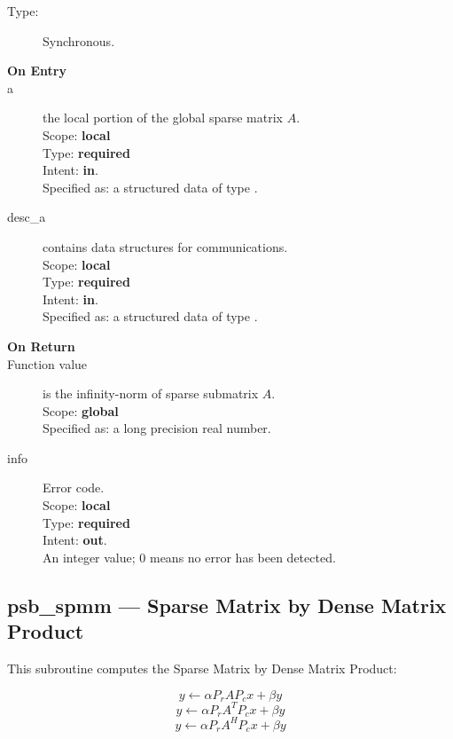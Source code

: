 \begin{description}
\item[Type:] Synchronous.
\item[\bf On Entry]
\item[a] the local  portion of the global sparse matrix
$A$. \\   
Scope: {\bf local} \\
Type: {\bf required}\\
Intent: {\bf in}.\\
Specified as: a structured data of type \spdata.
\item[desc\_a] contains data structures for communications.\\
Scope: {\bf local} \\
Type: {\bf required}\\
Intent: {\bf in}.\\
Specified as: a structured data of type \descdata.
\item[\bf On Return] 
\item[Function value] is the infinity-norm of sparse submatrix $A$.\\
Scope: {\bf global} \\
Specified as: a long precision real number.
\item[info] Error code.\\
Scope: {\bf local} \\
Type: {\bf required} \\
Intent: {\bf out}.\\
An integer value; 0 means no error has been detected. 
\end{description}


%
%


\clearpage\subsection*{psb\_spmm --- Sparse Matrix by Dense Matrix Product}   

This subroutine computes the Sparse Matrix by Dense Matrix Product:

\begin{equation}
y \leftarrow \alpha P_r A P_c x + \beta y
\label{eq:f90spmm_no_tra}
\end{equation}
\begin{equation}
y \leftarrow \alpha P_r A^T P_c x + \beta y
\label{eq:f90spmm_tra}
\end{equation}
\begin{equation}
y \leftarrow \alpha P_r A^H P_c x + \beta y
\label{eq:f90spmm_con}
\end{equation}

